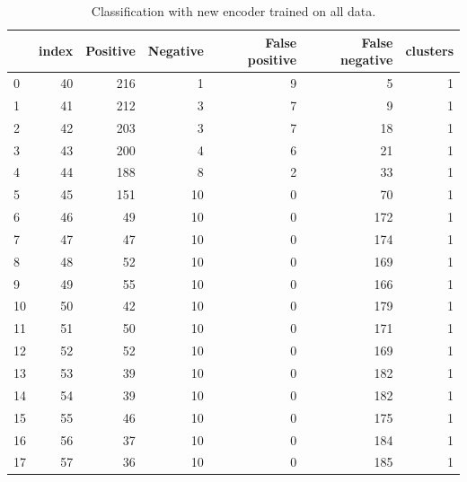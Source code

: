 \documentclass[a4paper,twoside,12pt]{book}
\begin{document}
\begin{appendices}
\begin{table}
	\centering
	\caption{Classification with new encoder trained on all data.}
	\label{id:tab:SVMencWoLab}
	\begin{tabular}{lrrrrrr}
		\toprule
		{} &  index &  Positive &  Negative &  False positive &  False negative &  clusters \\
		\midrule
		0   &     40 &       216 &         1 &               9 &               5 &         1 \\
		1   &     41 &       212 &         3 &               7 &               9 &         1 \\
		2   &     42 &       203 &         3 &               7 &              18 &         1 \\
		3   &     43 &       200 &         4 &               6 &              21 &         1 \\
		4   &     44 &       188 &         8 &               2 &              33 &         1 \\
		5   &     45 &       151 &        10 &               0 &              70 &         1 \\
		6   &     46 &        49 &        10 &               0 &             172 &         1 \\
		7   &     47 &        47 &        10 &               0 &             174 &         1 \\
		8   &     48 &        52 &        10 &               0 &             169 &         1 \\
		9   &     49 &        55 &        10 &               0 &             166 &         1 \\
		10  &     50 &        42 &        10 &               0 &             179 &         1 \\
		11  &     51 &        50 &        10 &               0 &             171 &         1 \\
		12  &     52 &        52 &        10 &               0 &             169 &         1 \\
		13  &     53 &        39 &        10 &               0 &             182 &         1 \\
		14  &     54 &        39 &        10 &               0 &             182 &         1 \\
		15  &     55 &        46 &        10 &               0 &             175 &         1 \\
		16  &     56 &        37 &        10 &               0 &             184 &         1 \\
		17  &     57 &        36 &        10 &               0 &             185 &         1 \\

\end{tabular}
\end{table}
\end{appendices}
\end{document}
